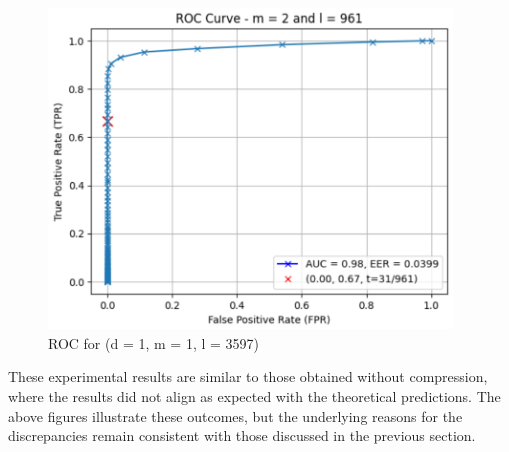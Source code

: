 \begin{enumerate}
\begin{itemize}
            \begin{figure}[H]
                \centering
                \includegraphics[width=\linewidth,height=8.5cm,keepaspectratio]{latex-img/FNR-FPR_ROC_TPR_config2.png}
                \caption{ROC for (d = 1, m = 1, l = 3597)}
                \label{FNR-FPR_ROC_TPR_config2}
            \end{figure}
        \end{itemize}
\end{enumerate}

These experimental results are similar to those obtained without compression, where the results did not align as expected with the theoretical predictions. The above figures illustrate these outcomes, but the underlying reasons for the discrepancies remain consistent with those discussed in the previous section.
